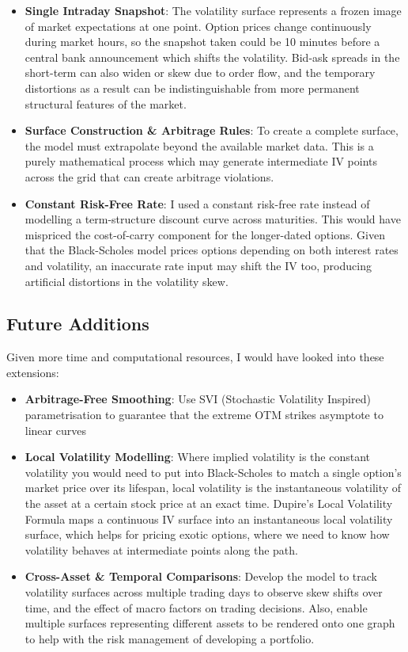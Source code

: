 \documentclass[11pt]{article}
\begin{document}
\begin{itemize}
    \item \textbf{Single Intraday Snapshot}: The volatility surface represents a frozen image of market expectations at one point. Option prices change continuously during market hours, so the snapshot taken could be 10 minutes before a central bank announcement which shifts the volatility. Bid-ask spreads in the short-term can also widen or skew due to order flow, and the temporary distortions as a result can be indistinguishable from more permanent structural features of the market. 
    \item \textbf{Surface Construction \& Arbitrage Rules}: To create a complete surface, the model must extrapolate beyond the available market data. This is a purely mathematical process which may generate intermediate IV points across the grid that can create arbitrage violations. 
    \item \textbf{Constant Risk-Free Rate}: I used a constant risk-free rate instead of modelling a term-structure discount curve across maturities. This would have mispriced the cost-of-carry component for the longer-dated options. Given that the Black-Scholes model prices options depending on both interest rates and volatility, an inaccurate rate input may shift the IV too, producing artificial distortions in the volatility skew.
\end{itemize}

\vspace{0.8em}

\subsection{Future Additions} 

Given more time and computational resources, I would have looked into these extensions:

\begin{itemize}
    \item \textbf{Arbitrage-Free Smoothing}: Use SVI (Stochastic Volatility Inspired) parametrisation to guarantee that the extreme OTM strikes asymptote to linear curves
    \item \textbf{Local Volatility Modelling}: Where implied volatility is the constant volatility  you would need to put into Black-Scholes to match a single option's market price over its lifespan, local volatility is the instantaneous volatility of the asset at a certain stock price at an exact time. Dupire's Local Volatility Formula maps a continuous IV surface into an instantaneous local volatility surface, which helps for pricing exotic options, where we need to know how volatility behaves at intermediate points along the path.
    \item \textbf{Cross-Asset \& Temporal Comparisons}: Develop the model to track volatility surfaces across multiple trading days to observe skew shifts over time, and the effect of macro factors on trading decisions. Also, enable multiple surfaces representing different assets to be rendered onto one graph to help with the risk management of developing a portfolio.
\end{itemize}
\end{document}
